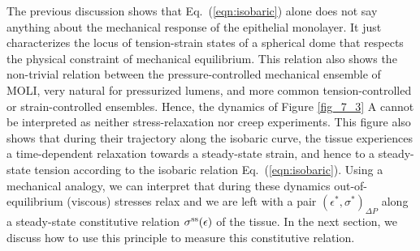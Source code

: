 

The previous discussion shows that Eq.~(\ref{eqn:isobaric}) alone does not say anything about the mechanical response of the epithelial monolayer. It just characterizes the locus of tension-strain states of a spherical dome that respects the physical constraint of mechanical equilibrium. This relation also shows the non-trivial relation between the pressure-controlled mechanical ensemble of MOLI, very natural for pressurized lumens, and more common tension-controlled  or strain-controlled ensembles.
Hence, the dynamics of Figure \ref{fig_7_3} A cannot be interpreted as neither stress-relaxation nor creep experiments. This figure also shows that during their trajectory along the isobaric curve, the tissue experiences a time-dependent relaxation towards a steady-state strain, and hence to a steady-state tension according to the isobaric relation Eq.~(\ref{eqn:isobaric}). Using a mechanical analogy, we can interpret that during these dynamics out-of-equilibrium (viscous) stresses relax and we are left with a pair $(\epsilon^*, \sigma^*)_{\Delta P}$ along a steady-state constitutive relation $\sigma^{\rm ss}(\epsilon)$ of the tissue. In the next section, we discuss how to use this principle to measure this constitutive relation.





